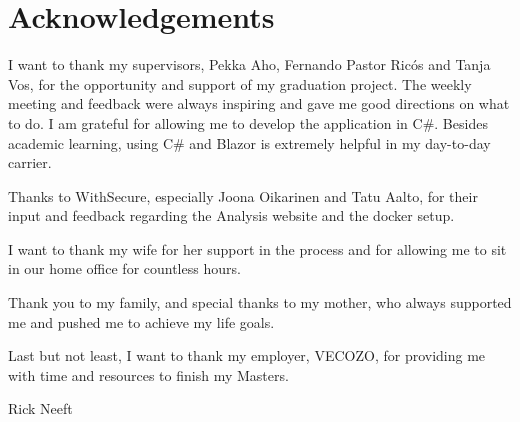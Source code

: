 \chapter*{Acknowledgements}

I want to thank my supervisors, Pekka Aho, Fernando Pastor Ricós and Tanja Vos, for the opportunity and support of my graduation project. The weekly meeting and feedback were always inspiring and gave me good directions on what to do. I am grateful for allowing me to develop the application in C\#. Besides academic learning, using C\# and Blazor is extremely helpful in my day-to-day carrier.

Thanks to WithSecure, especially Joona Oikarinen and Tatu Aalto, for their input and feedback regarding the Analysis website and the docker setup.

I want to thank my wife for her support in the process and for allowing me to sit in our home office for countless hours. 

Thank you to my family, and special thanks to my mother, who always supported me and pushed me to achieve my life goals. 

Last but not least, I want to thank my employer, VECOZO, for providing me with time and resources to finish my Masters. 

Rick Neeft\\
\myPresentationDate